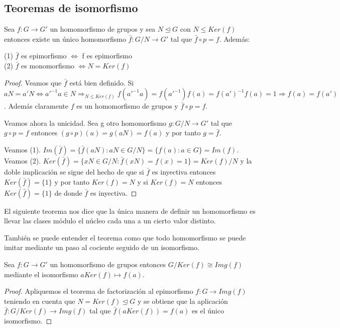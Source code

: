 \subsection{Teoremas de isomorfismo}

\begin{nprop}
Sea $f:G \rightarrow G'$ un homomorfismo de grupos y sea $N \trianglelefteq G$ con $N \le Ker(f)$ entonces existe un único homomorfismo $\bar{f}:G/N \rightarrow G'$ tal que $\bar{f} \circ p = f$. Además:

(1) $\bar{f}$ es epimorfismo $\iff$ f es epimorfismo \\
(2) $\bar{f}$ es monomorfismo $\iff N = Ker(f)$
\end{nprop}
\begin{proof}
Veamos que $\bar{f}$ está bien definido. Si $aN = a'N \iff a'^{-1}a \in N \Rightarrow_{N \le Ker(f)} f(a'^{-1}a) = f(a'^{-1})f(a) = f(a')^{-1}f(a) = 1 \Rightarrow f(a) = f(a')$. Además claramente $f$ es un homomorfismo de grupos y $\bar{f} \circ p = f$.

Veamos ahora la unicidad. Sea g otro homomorfismo $g:G/N \rightarrow G'$ tal que $g \circ p = f$ entonces $(g \circ p)(a) = g(aN) = f(a)$ y por tanto $g = \bar{f}$.

Veamos (1). $Im(\bar{f}) = \{\bar{f}(aN):aN \in G/N\} = \{f(a):a \in G\} = Im(f)$. \\
Veamos (2). $Ker(\bar{f}) = \{xN \in G/N :\bar{f}(xN) = f(x) = 1\} =  Ker(f)/N$ y la doble implicación se sigue del hecho de que si $\bar{f}$ es inyectiva entonces $Ker(\bar{f}) = \{1\}$ y por tanto $Ker(f) = N$ y si $Ker(f) = N$ entonces $Ker(\bar{f}) = \{1\}$ de donde $\bar{f}$ es inyectiva.
\end{proof}

El siguiente teorema nos dice que la única manera de definir un homomorfismo es llevar las clases módulo el núcleo cada una a un cierto valor distinto. 

También se puede entender el teorema como que todo homomorfismo se puede imitar mediante un paso al cociente seguido de un isomorfismo. 

\begin{nth}
Sea $f:G \rightarrow G'$ un homomorfismo de grupos entonces $G/Ker(f) \cong Img(f)$ mediante el isomorfismo $aKer(f) \mapsto f(a)$.
\end{nth}
\begin{proof}
Apliquemos el teorema de factorización al epimorfismo $f:G \rightarrow Img(f)$ teniendo en cuenta que $N=Ker(f) \trianglelefteq G$ y se obtiene que la aplicación $\bar{f}:G/Ker(f) \rightarrow Img(f)$ tal que $\bar{f}(aKer(f)) = f(a)$ es el único isomorfismo.
\end{proof}

